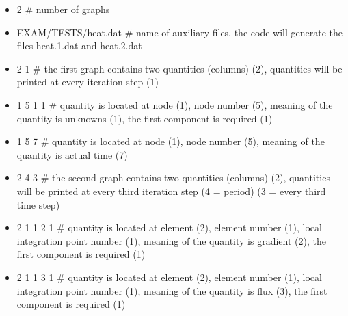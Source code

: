 \begin{itemize}
\item[]
2 \# number of graphs
\item[]
EXAM/TESTS/heat.dat \# name of auxiliary files, the code will generate the files heat.1.dat
and heat.2.dat
\item[]
2 1 \# the first graph contains two quantities (columns) (2), quantities will be printed at every iteration step (1)
\item[]
1 5 1 1 \# quantity is located at node (1), node number (5), meaning of the quantity is unknowns (1), the first
component is required (1)
\item[]
1 5 7 \# quantity is located at node (1), node number (5), meaning of the quantity is actual time (7)
\item[]
2 4 3 \# the second graph contains two quantities (columns) (2), quantities will be printed at every third
iteration step (4 = period) (3 = every third time step)
\item[]
2 1 1 2 1 \# quantity is located at element (2), element number (1), local integration point number (1),
meaning of the quantity is gradient (2), the first component is required (1)
\item[]
2 1 1 3 1 \# quantity is located at element (2), element number (1), local integration point number (1),
meaning of the quantity is flux (3), the first component is required (1)
\end{itemize}
